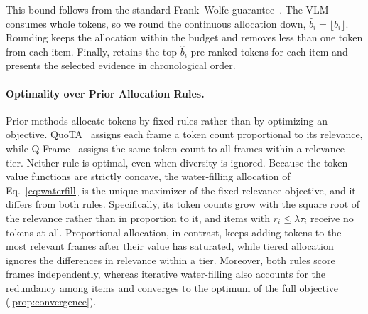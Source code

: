 \noindent This bound follows from the standard Frank--Wolfe guarantee~\cite{jaggi2013}. The VLM consumes whole tokens, so we round the continuous allocation down, $\hat b_i=\lfloor b_i\rfloor$. Rounding keeps the allocation within the budget and removes less than one token from each item. Finally, \name retains the top $\hat b_i$ pre-ranked tokens for each item and presents the selected evidence in chronological order.

\paragraph{Optimality over Prior Allocation Rules.}
Prior methods allocate tokens by fixed rules rather than by optimizing an objective. QuoTA~\cite{luo2025quota} assigns each frame a token count proportional to its relevance, while Q-Frame~\cite{zhang2025qframe} assigns the same token count to all frames within a relevance tier. Neither rule is optimal, even when diversity is ignored. Because the token value functions are strictly concave, the water-filling allocation of Eq.~\eqref{eq:waterfill} is the unique maximizer of the fixed-relevance objective, and it differs from both rules. Specifically, its token counts grow with the square root of the relevance rather than in proportion to it, and items with $\bar r_i\le\lambda\tau_i$ receive no tokens at all. Proportional allocation, in contrast, keeps adding tokens to the most relevant frames after their value has saturated, while tiered allocation ignores the differences in relevance within a tier. Moreover, both rules score frames independently, whereas iterative water-filling also accounts for the redundancy among items and converges to the optimum of the full objective (\cref{prop:convergence}).




